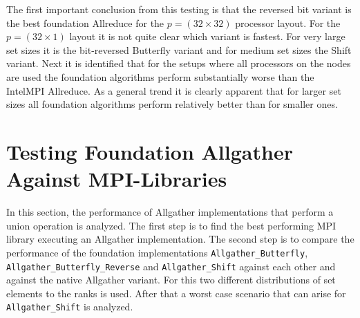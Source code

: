 The first important conclusion from this testing is that the reversed bit variant is the best foundation Allreduce for the $p=(32\times32)$  processor layout. For the $p=(32\times1)$ layout it is not quite clear which variant is fastest. For very large set sizes it is the bit-reversed Butterfly variant and for medium set sizes the Shift variant. 
Next it is identified that for the setups where all processors on the nodes are used the foundation algorithms perform substantially worse than the IntelMPI Allreduce. As a general trend it is clearly apparent that for larger set sizes all foundation algorithms perform relatively better than for smaller ones.

\section{Testing Foundation Allgather Against MPI-Libraries} \label{sec:baseAllgather}
In this section, the performance of Allgather implementations  that perform a union operation is analyzed. The first step is to find the best performing MPI library executing an Allgather implementation. The second step is to compare the performance of the foundation implementations \texttt{All\-gath\-er\_But\-ter\-fly}, \texttt{All\-gath\-er\_But\-ter\-fly\_Reverse} and \texttt{All\-gath\-er\-\_\-Shift} against each other and against the native Allgather variant. For this two different distributions of set elements to the ranks is used. After that a worst case scenario that can arise for \texttt{All\-gath\-er\-\_\-Shift} is analyzed.

